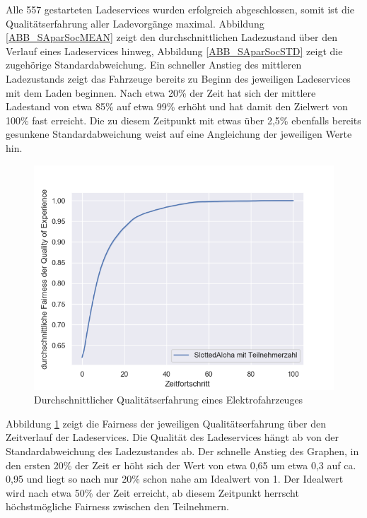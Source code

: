 Alle 557 gestarteten Ladeservices wurden erfolgreich abgeschlossen, somit ist die Qualitätserfahrung aller Ladevorgänge maximal. Abbildung \ref{ABB_SAparSocMEAN} zeigt den durchschnittlichen Ladezustand über den Verlauf eines Ladeservices hinweg, Abbildung \ref{ABB_SAparSocSTD} zeigt die zugehörige Standardabweichung. Ein schneller Anstieg des mittleren Ladezustands zeigt das Fahrzeuge bereits zu Beginn des jeweiligen Ladeservices mit dem Laden beginnen. Nach etwa 20\% der Zeit hat sich der mittlere Ladestand von etwa 85\% auf etwa 99\% erhöht und hat damit den Zielwert von 100\% fast erreicht. Die zu diesem Zeitpunkt mit etwas über 2,5\% ebenfalls bereits gesunkene Standardabweichung weist auf eine Angleichung der jeweiligen Werte hin.
\begin{figure}[htb]
\centering
	\includegraphics[scale=0.4]{img/SA_par/SlottedAloha_participants_VDE_tau_10_qoe.png}
	\caption{Durchschnittlicher Qualitätserfahrung eines Elektrofahrzeuges}
	\label{Abb_SAparFairness}
\end{figure}
Abbildung \ref{Abb_SAparFairness} zeigt die Fairness der jeweiligen Qualitätserfahrung über den Zeitverlauf der Ladeservices. Die Qualität des Ladeservices hängt ab von der Standardabweichung des Ladezustandes ab. Der schnelle Anstieg des Graphen, in den ersten 20\% der Zeit er höht sich der Wert von etwa 0,65 um etwa 0,3 auf ca. 0,95 und liegt so nach nur 20\% schon nahe am Idealwert von 1. Der Idealwert wird nach etwa 50\% der Zeit erreicht, ab diesem Zeitpunkt herrscht höchstmögliche Fairness zwischen den Teilnehmern.

